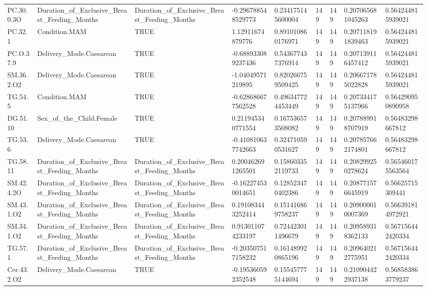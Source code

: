 \begin{longtable}{lllllllll}
PC.30.0.3O & Duration\_of\_Exclusive\_Breast\_Feeding\_Months & Duration\_of\_Exclusive\_Breast\_Feeding\_Months & -0.296788548529773 & 0.234175145600004 & 149 & 149 & 0.207065681045263 & 0.564244815939021 \\
PC.32.1 & Condition.MAM & TRUE & 1.12911674879776 & 0.891010860176971 & 149 & 149 & 0.207118191839463 & 0.564244815939021 \\
PC.O.37.9 & Delivery\_Mode.Caesarean & TRUE & -0.688933089237436 & 0.543677437376914 & 149 & 149 & 0.207139116457412 & 0.564244815939021 \\
SM.36.2.O2 & Delivery\_Mode.Caesarean & TRUE & -1.04049571219895 & 0.820266759509425 & 149 & 149 & 0.206671785022828 & 0.564244815939021 \\
TG.54.5 & Condition.MAM & TRUE & -0.628686677562528 & 0.496347724453449 & 149 & 149 & 0.207334175137966 & 0.564290950890958 \\
DG.51.10 & Sex\_of\_the\_Child.Female & TRUE & 0.211945340771554 & 0.167536573508082 & 149 & 149 & 0.207889918707919 & 0.56483298667812 \\
TG.53.6 & Delivery\_Mode.Caesarean & TRUE & -0.410810637742663 & 0.324710590531627 & 149 & 149 & 0.207857662174801 & 0.56483298667812 \\
TG.58.11 & Duration\_of\_Exclusive\_Breast\_Feeding\_Months & Duration\_of\_Exclusive\_Breast\_Feeding\_Months & 0.200462691265501 & 0.158603352119733 & 149 & 149 & 0.208299250278624 & 0.565460175563564 \\
SM.42.4.2O & Duration\_of\_Exclusive\_Breast\_Feeding\_Months & Duration\_of\_Exclusive\_Breast\_Feeding\_Months & -0.162274530014651 & 0.128523470402386 & 149 & 149 & 0.208771576645919 & 0.56625715309441 \\
SM.43.1.O2 & Duration\_of\_Exclusive\_Breast\_Feeding\_Months & Duration\_of\_Exclusive\_Breast\_Feeding\_Months & 0.191083443252414 & 0.151416869758237 & 149 & 149 & 0.209000010007369 & 0.566391814972921 \\
SM.34.1.O2 & Duration\_of\_Exclusive\_Breast\_Feeding\_Months & Duration\_of\_Exclusive\_Breast\_Feeding\_Months & 0.913011074233197 & 0.724423011496679 & 149 & 149 & 0.209589318362133 & 0.567156442420334 \\
TG.57.1 & Duration\_of\_Exclusive\_Breast\_Feeding\_Months & Duration\_of\_Exclusive\_Breast\_Feeding\_Months & -0.203507517158232 & 0.161489920865196 & 149 & 149 & 0.209640212775951 & 0.567156442420334 \\
Cer.43.2.O2 & Delivery\_Mode.Caesarean & TRUE & -0.195360592352548 & 0.155457775144694 & 149 & 149 & 0.210904422937138 & 0.568583863779237 \\

\end{longtable}
